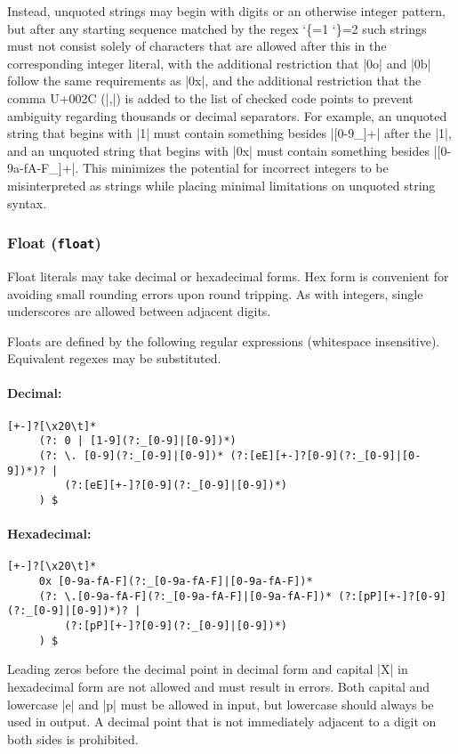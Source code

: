\documentclass[11pt]{article}
\makeatletter
\newcommand{\lit}{%
  \begingroup
  \let\do\@makeother
  \dospecials
  \catcode`\{=1
  \catcode`\}=2
  \lit@i}
\def\lit@i#1{%
  \endgroup
  \texttt{\color{DarkRed}\detokenize{#1}}}
\makeatother
\begin{document}
Instead, unquoted strings may begin with digits or an otherwise integer pattern, but after any starting sequence matched by the regex \lit{[+-]?[\x20\t]*(?:0x|0o|0b|[0-9])} such strings must not consist solely of characters that are allowed after this in the corresponding integer literal, with the additional restriction that |0o| and |0b| follow the same requirements as |0x|, and the additional restriction that the comma U+002C (|,|) is added to the list of checked code points to prevent ambiguity regarding thousands or decimal separators.  For example, an unquoted string that begins with |1| must contain something besides |[0-9_]+| after the |1|, and an unquoted string that begins with |0x| must contain something besides |[0-9a-fA-F_]+|.  This minimizes the potential for incorrect integers to be misinterpreted as strings while placing minimal limitations on unquoted string syntax.


\subsubsection{Float (\texttt{float})}

Float literals may take decimal or hexadecimal forms.  Hex form is convenient for avoiding small rounding errors upon round tripping.  As with integers, single underscores are allowed between adjacent digits.

Floats are defined by the following regular expressions (whitespace insensitive).  Equivalent regexes may be substituted.

\paragraph{Decimal:}
\begin{Verbatim}[fontsize=\small]
[+-]?[\x20\t]*
     (?: 0 | [1-9](?:_[0-9]|[0-9])*)
     (?: \. [0-9](?:_[0-9]|[0-9])* (?:[eE][+-]?[0-9](?:_[0-9]|[0-9])*)? |
         (?:[eE][+-]?[0-9](?:_[0-9]|[0-9])*) 
     ) $
\end{Verbatim}

\paragraph{Hexadecimal:}
\begin{Verbatim}[fontsize=\small]
[+-]?[\x20\t]* 
     0x [0-9a-fA-F](?:_[0-9a-fA-F]|[0-9a-fA-F])*
     (?: \.[0-9a-fA-F](?:_[0-9a-fA-F]|[0-9a-fA-F])* (?:[pP][+-]?[0-9](?:_[0-9]|[0-9])*)? |
         (?:[pP][+-]?[0-9](?:_[0-9]|[0-9])*)
     ) $
\end{Verbatim}
Leading zeros before the decimal point in decimal form and capital |X| in hexadecimal form are not allowed and must result in errors.  Both capital and lowercase |e| and |p| must be allowed in input, but lowercase should always be used in output.  A decimal point that is not immediately adjacent to a digit on both sides is prohibited.
\end{document}
